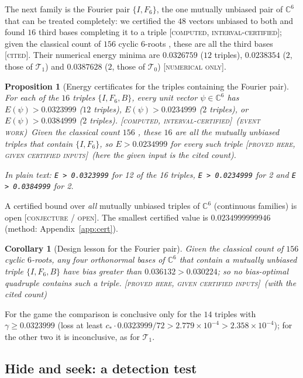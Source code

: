 \documentclass[11pt]{article}
\newcommand{\C}{\mathbb{C}}
\newcommand{\Tz}{\mathcal{T}_0}          %
\newcommand{\To}{\mathcal{T}_1}          %
\newcommand{\E}{E}                       %
\newcommand{\cstar}{c_\ast}              %
\newcommand{\st}[1]{\textsc{[#1]}}
\newcommand{\stgiven}{\st{proved here, given certified inputs}}
\newcommand{\stcert}{\st{computed, interval-certified}}
\newcommand{\stnum}{\st{numerical only}}
\newcommand{\stcited}{\st{cited}}
\newcommand{\stconj}{\st{conjecture / open}}
\newcommand{\event}{\textsc{(event work)}}
\newtheorem{proposition}[theorem]{Proposition}
\newtheorem{corollary}[theorem]{Corollary}
\theoremstyle{definition}
\theoremstyle{remark}
\begin{document}
The next family is the Fourier pair $\{I,F_6\}$, the one mutually unbiased pair of $\C^6$ that can be treated
completely: we certified the $48$ vectors unbiased to both and found $16$ third bases completing it to a
triple \stcert; given the classical count of $156$ cyclic $6$-roots \cite{BF91,Grassl}, these are all the third
bases \stcited. Their numerical energy minima are $0.0326759$ ($12$ triples), $0.0238354$ ($2$, those of $\To$) and
$0.0387628$ ($2$, those of $\Tz$) \stnum.

\begin{proposition}[Energy certificates for the triples containing the Fourier pair]\label{prop:fourier6}
For each of the $16$ triples $\{I,F_6,B\}$, every unit vector $\psi\in\C^6$ has
$\E(\psi)>0.0323999$ ($12$ triples), $\E(\psi)>0.0234999$ ($2$ triples), or $\E(\psi)>0.0384999$ ($2$ triples).
\stcert\ \event\ Given the classical count $156$ \cite{BF91}, these $16$ are all the mutually unbiased triples that
contain $\{I,F_6\}$, so $\E>0.0234999$ for every such triple \stgiven\ (here the given input is the cited count).

In plain text: \texttt{E > 0.0323999} for 12 of the 16 triples, \texttt{E > 0.0234999} for 2 and \texttt{E > 0.0384999}
for 2.
\end{proposition}
A certified bound over \emph{all} mutually unbiased triples of $\C^6$ (continuous families) is open \stconj. The
smallest certified value is $0.0234999999946$ (method: Appendix~\ref{app:cert}).

\begin{corollary}[Design lesson for the Fourier pair]\label{cor:fourier6}
Given the classical count of $156$ cyclic $6$-roots, any four orthonormal bases of $\C^6$ that contain a mutually
unbiased triple $\{I,F_6,B\}$ have bias greater than $0.036132>0.030224$; so no bias-optimal quadruple contains such a
triple. \stgiven\ (with the cited count)
\end{corollary}

For the game the comparison is conclusive only for the $14$ triples with $\gamma\ge0.0323999$ (loss at least
$\cstar\cdot0.0323999/72>2.779\times10^{-4}>2.358\times10^{-4}$); for the other two it is inconclusive, as for $\To$.

\subsection{Hide and seek: a detection test}\label{sec:hide}
\end{document}
